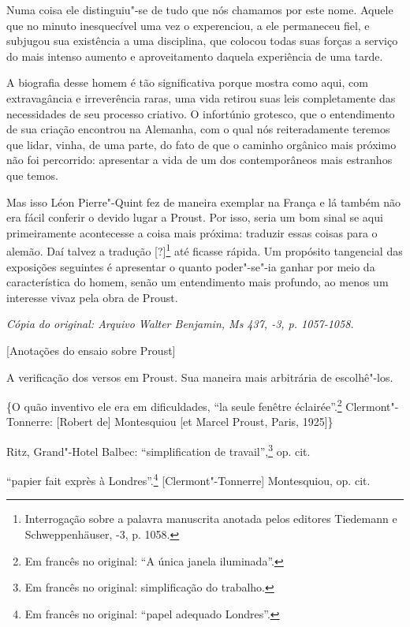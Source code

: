 Numa coisa ele distinguiu"-se de tudo que nós chamamos por este nome.
Aquele que no minuto inesquecível uma vez o experenciou, a ele
permaneceu fiel, e subjugou sua existência a uma disciplina, que colocou
todas suas forças a serviço do mais intenso aumento e aproveitamento
daquela experiência de uma tarde.

A biografia desse homem é tão significativa porque mostra como aqui, com
extravagância e irreverência raras, uma vida retirou suas leis
completamente das necessidades de seu processo criativo. O infortúnio
grotesco, que o entendimento de
sua criação encontrou na Alemanha, com o qual nós reiteradamente
teremos que lidar, vinha, de uma parte, do fato de que o caminho orgânico
mais próximo não foi percorrido: apresentar a vida de um dos
contemporâneos mais estranhos que temos.

Mas isso Léon Pierre"-Quint fez de maneira exemplar na França e lá também
não era fácil conferir o devido lugar a Proust. Por isso, seria um bom
sinal se aqui primeiramente acontecesse a coisa mais próxima: traduzir
essas coisas para o alemão. Daí talvez a tradução {[}?{]}\footnote{Interrogação sobre a palavra manuscrita anotada pelos editores
  Tiedemann e Schweppenhäuser, -3, p. 1058. \versal{[N. T.]}} até ficasse
rápida. Um propósito tangencial das exposições seguintes é apresentar o
quanto poder"-se"-ia ganhar por meio da característica do homem, senão um
entendimento mais profundo, ao menos um interesse vivaz pela obra de
Proust.


\begin{flushright}
\emph{\small{Cópia do original: Arquivo Walter Benjamin, Ms 437, -3, p. 1057-1058.}}
\end{flushright}

{[}Anotações do ensaio sobre Proust{]}

A verificação dos versos em Proust. Sua maneira mais arbitrária de
escolhê"-los.

\{O quão inventivo ele era em dificuldades, ``la seule fenêtre
éclairée''.\footnote{Em francês no original: ``A única janela iluminada''. \versal{[N. T.]}}
Clermont"-Tonnerre: {[}Robert de{]} Montesquiou {[}et Marcel Proust,
Paris, 1925{]}\}

Ritz, Grand"-Hotel Balbec: ``simplification de travail'',\footnote{Em francês no original: simplificação do trabalho. \versal{[N. T.]}} op. cit.

``papier fait exprès à Londres''.\footnote{Em francês no original: ``papel adequado
  Londres''. \versal{[N. T.]}} {[}Clermont"-Tonnerre{]} Montesquiou, op. cit.


